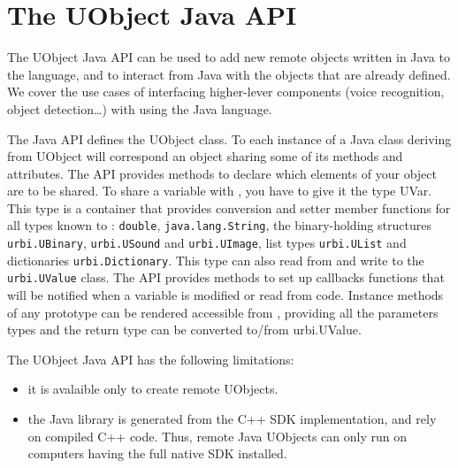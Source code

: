 

\chapter{The UObject Java API}
\label{sec:uob:apijava}

The UObject Java API can be used to add new remote objects written in Java
to the \us language, and to interact from Java with the objects that are
already defined. We cover the use cases of interfacing higher-lever components
(voice recognition, object detection\ldots) with \urbi using the Java language.

The Java API defines the UObject class. To each instance of a Java class
deriving from UObject will correspond an \us object sharing some of its
methods and attributes. The API provides methods to declare which elements
of your object are to be shared. To share a variable with \urbi, you have to
give it the type UVar. This type is a container that provides conversion and
setter member functions for all types known to \urbi: \lstinline{double},
\lstinline{java.lang.String}, the binary-holding structures
\lstinline{urbi.UBinary}, \lstinline{urbi.USound} and
\lstinline{urbi.UImage}, list types \lstinline{urbi.UList} and dictionaries
\lstinline{urbi.Dictionary}. This type can also read from and write to the
\lstinline{urbi.UValue} class. The API provides methods to set up callbacks
functions that will be notified when a variable is modified or read from
\urbi code. Instance methods of any prototype can be rendered accessible
from \us, providing all the parameters types and the return type can be
converted to/from urbi.UValue.

The UObject Java API has the following limitations:
\begin{itemize}
\item it is avalaible only to create remote UObjects.
\item the Java library is generated from the C++ SDK implementation, and rely
on compiled C++ code. Thus, remote Java UObjects can only run on computers
having the full \urbi native SDK installed.
\end{itemize}

